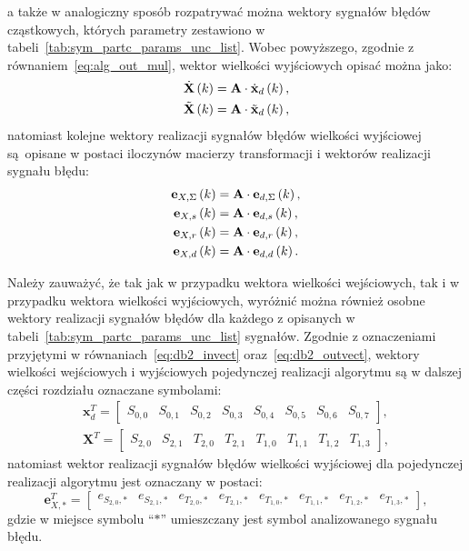 a także w analogiczny sposób rozpatrywać można wektory sygnałów błędów cząstkowych, których parametry zestawiono w tabeli~\ref{tab:sym_partc_params_unc_list}. Wobec powyższego, zgodnie z równaniem~\eqref{eq:alg_out_mul}, wektor wielkości wyjściowych opisać można jako:
\begin{gather}
\dot{\mathbf{X}} \left(k\right) = \mathbf{A} \cdot \dot{\mathbf{x}}_{d} \left(k\right) \label{eq:sym_partd_output_ideal}, \\
\tilde{\mathbf{X}} \left(k\right) = \mathbf{A} \cdot \tilde{\mathbf{x}}_{d} \left(k\right) \label{eq:sym_partd_output_real},
\end{gather}
natomiast kolejne wektory realizacji sygnałów błędów wielkości wyjściowej są opisane w postaci iloczynów macierzy transformacji i wektorów realizacji sygnału błędu:
\begin{gather}
\mathbf{e}_{X,\Sigma} \left(k\right) = \mathbf{A} \cdot \mathbf{e}_{d,\Sigma} \left(k\right) \label{eq:sym_partd_output_error_sum}, \\
\mathbf{e}_{X,s} \left(k\right) = \mathbf{A} \cdot \mathbf{e}_{d,s} \left(k\right) \label{eq:sym_partd_output_error_stat}, \\
\mathbf{e}_{X,r} \left(k\right) = \mathbf{A} \cdot \mathbf{e}_{d,r} \left(k\right) \label{eq:sym_partd_output_error_rand}, \\
\mathbf{e}_{X,d} \left(k\right) = \mathbf{A} \cdot \mathbf{e}_{d,d} \left(k\right) \label{eq:sym_partd_output_error_dyn}.
\end{gather}

Należy zauważyć, że tak jak w przypadku wektora wielkości wejściowych, tak i w przypadku wektora wielkości wyjściowych, wyróżnić można również osobne wektory realizacji sygnałów błędów dla każdego z opisanych w tabeli~\ref{tab:sym_partc_params_unc_list} sygnałów. Zgodnie z oznaczeniami przyjętymi w równaniach~\eqref{eq:db2_invect} oraz~\eqref{eq:db2_outvect}, wektory wielkości wejściowych i wyjściowych pojedynczej realizacji algorytmu są w dalszej części rozdziału oznaczane symbolami:
\begin{gather}
\mathbf{x}_{d}^{T} =
\begin{bmatrix}
S_{0,0} & S_{0,1} & S_{0,2} & S_{0,3} & S_{0,4} & S_{0,5} & S_{0,6} & S_{0,7}
\end{bmatrix}
\label{eq:sym_partd_invect}, \\
\mathbf{X}^{T} =
\begin{bmatrix}
S_{2,0} & S_{2,1} & T_{2,0} & T_{2,1} & T_{1,0} & T_{1,1} & T_{1,2} & T_{1,3}
\end{bmatrix}
\label{eq:sym_partd_outvect},
\end{gather}
natomiast wektor realizacji sygnałów błędów wielkości wyjściowej dla pojedynczej realizacji algorytmu jest oznaczany w postaci:
\begin{equation}
\mathbf{e}_{X,*}^{T} =
\begin{bmatrix}
e_{S_{2,0},*} & e_{S_{2,1},*} & e_{T_{2,0},*} & e_{T_{2,1},*} & e_{T_{1,0},*} & e_{T_{1,1},*} & e_{T_{1,2},*} & e_{T_{1,3},*}
\end{bmatrix}
\label{eq:sym_partd_errvect},
\end{equation}
gdzie w miejsce symbolu \enquote{$*$} umieszczany jest symbol analizowanego sygnału błędu.

